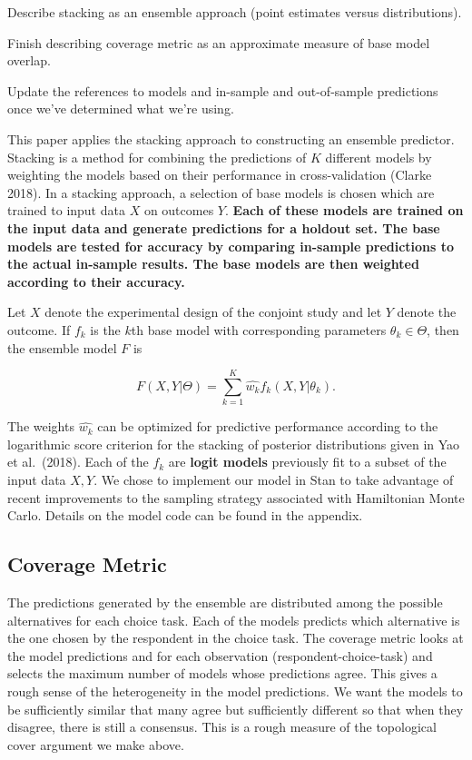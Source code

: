 \documentclass[12pt,titlepage]{mktg-article}
\begin{document}
Describe stacking as an ensemble approach (point estimates versus distributions).

Finish describing coverage metric as an approximate measure of base model overlap.

Update the references to models and in-sample and out-of-sample predictions once we've determined what we're using.

This paper applies the stacking approach to constructing an ensemble predictor. Stacking is a method for combining the predictions of \(K\) different models by weighting the models based on their performance in cross-validation (Clarke 2018). In a stacking approach, a selection of base models is chosen which are trained to input data \(X\) on outcomes \(Y\). \textbf{Each of these models are trained on the input data and generate predictions for a holdout set. The base models are tested for accuracy by comparing in-sample predictions to the actual in-sample results. The base models are then weighted according to their accuracy.}

Let \(X\) denote the experimental design of the conjoint study and let \(Y\) denote the outcome. If \(f_k\) is the \(k\)th base model with corresponding parameters \(\theta_k \in \Theta\), then the ensemble model \(F\) is

\[F(X,Y|\Theta) = \sum_{k=1}^K \hat{w_k} f_k(X, Y|\theta_k).\]

The weights \(\hat{w_k}\) can be optimized for predictive performance according to the logarithmic score criterion for the stacking of posterior distributions given in Yao et al.~(2018). Each of the \(f_k\) are \textbf{logit models} previously fit to a subset of the input data \(X,Y\). We chose to implement our model in Stan to take advantage of recent improvements to the sampling strategy associated with Hamiltonian Monte Carlo. Details on the model code can be found in the appendix.

\hypertarget{coverage-metric}{%
\subsection{Coverage Metric}\label{coverage-metric}}

The predictions generated by the ensemble are distributed among the possible alternatives for each choice task. Each of the models predicts which alternative is the one chosen by the respondent in the choice task. The coverage metric looks at the model predictions and for each observation (respondent-choice-task) and selects the maximum number of models whose predictions agree. This gives a rough sense of the heterogeneity in the model predictions. We want the models to be sufficiently similar that many agree but sufficiently different so that when they disagree, there is still a consensus. This is a rough measure of the topological cover argument we make above.
\end{document}
